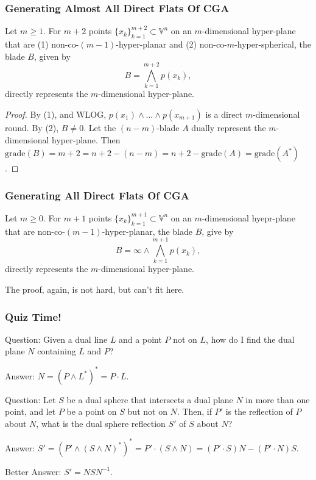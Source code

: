 \documentclass{beamer}
\newcommand{\V}{\mathbb{V}}
\newcommand{\nvai}{\infty}
\newcommand{\grade}{\mbox{grade}}
\begin{document}
\begin{frame}
\frametitle{Generating \alert{Almost} All \alert{Direct Flats} Of CGA}
\pause
Let $m\geq 1$.
For $m+2$ points $\{x_k\}_{k=1}^{m+2}\subset\V^n$ on an $m$-dimensional hyper-plane that
are \alert{(1)} non-co-$(m-1)$-hyper-planar and \alert{(2)} non-co-$m$-hyper-spherical, the blade $B$,
given by
\begin{equation*}
B = \bigwedge_{k=1}^{m+2} p(x_k),
\end{equation*}
\alert{directly} represents the $m$-dimensional hyper-plane.\pause
\begin{proof}
By \alert{(1)}, and WLOG, $p(x_1)\wedge\dots\wedge p(x_{m+1})$ is a
\alert{direct} $m$-dimensional round.  By \alert{(2)}, $B\neq 0$.
Let the $(n-m)$-blade $A$ \alert{dually} represent the $m$-dimensional
hyper-plane. Then $\grade(B)=m+2=n+2-(n-m)=n+2-\grade(A)=\grade(A^*)$.
\end{proof}
\end{frame}

\begin{frame}
\frametitle{Generating All \alert{Direct Flats} Of CGA}
\pause
Let $m\geq 0$.  For $m+1$ points $\{x_k\}_{k=1}^{m+1}\subset\V^n$ on an $m$-dimensional
hyepr-plane that are non-co-$(m-1)$-hyper-planar, the blade $B$, give by
\begin{equation*}
B = \nvai\wedge\bigwedge_{k=1}^{m+1} p(x_k),
\end{equation*}
\alert{directly} represents the $m$-dimensional hyper-plane.\pause

The proof, again, is not hard, but can't fit here.
\end{frame}

\begin{frame}
\frametitle{Quiz Time!}
\pause
\alert{Question}: Given a \alert{dual} line $L$ and a point $P$ not on $L$,
how do I find the \alert{dual} plane $N$ containing $L$ and $P$?\pause

\alert{Answer}: $N = (P\wedge L^*)^* = P\cdot L$.\pause

%

\alert{Question}: Let $S$ be a \alert{dual} sphere that intersects a \alert{dual} plane $N$ in more than one point, and let $P$ be a point on $S$ but not on $N$.  Then, if $P'$ is the reflection of $P$ about $N$, what is the \alert{dual} sphere reflection $S'$ of $S$ about $N$?\pause

\alert{Answer}: $S' = (P'\wedge(S\wedge N)^*)^* = P'\cdot(S\wedge N) = (P'\cdot S)N - (P'\cdot N)S$.\pause

\alert{Better Answer}: $S' = NSN^{-1}$.
\end{frame}
\end{document}
